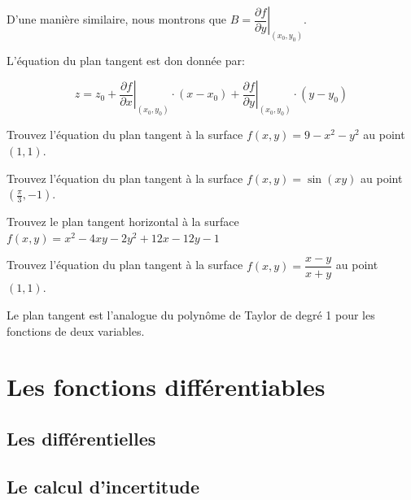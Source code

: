 \documentclass[]{book}
\theoremstyle{definition}
\theoremstyle{definition}
\theoremstyle{definition}
\theoremstyle{remark}
\let\BeginKnitrBlock\begin \let\EndKnitrBlock\end
\begin{document}
D'une manière similaire, nous montrons que
\(B=\left.\dfrac{\partial f}{\partial y}\right|_{(x_0,y_0)}\).

L'équation du plan tangent est don donnée par:

\[ z = z_0 + \left.\dfrac{\partial f}{\partial x}\right|_{(x_0,y_0)}\cdot (x-x_0)+\left.\dfrac{\partial f}{\partial y}\right|_{(x_0,y_0)}\cdot (y-y_0) \]

\BeginKnitrBlock{example}
\protect\hypertarget{exm:unnamed-chunk-171}{}{\label{exm:unnamed-chunk-171}
}Trouvez l'équation du plan tangent à la surface \(f(x,y)=9-x^2-y^2\) au
point \((1,1)\).
\EndKnitrBlock{example}
\vspace*{8cm}

\BeginKnitrBlock{example}
\protect\hypertarget{exm:unnamed-chunk-172}{}{\label{exm:unnamed-chunk-172}
}Trouvez l'équation du plan tangent à la surface \(f(x,y)=\sin(xy)\) au
point \(\left(\frac{\pi}{3},-1 \right)\).
\EndKnitrBlock{example}
\vspace*{8cm}

\BeginKnitrBlock{example}
\protect\hypertarget{exm:unnamed-chunk-173}{}{\label{exm:unnamed-chunk-173}
}Trouvez le plan tangent horizontal à la surface
\(f(x,y)=x^2-4xy-2y^2+12x-12y-1\)
\EndKnitrBlock{example}
\vspace*{8cm}

\BeginKnitrBlock{example}
\protect\hypertarget{exm:unnamed-chunk-174}{}{\label{exm:unnamed-chunk-174}
}Trouvez l'équation du plan tangent à la surface
\(f(x,y)=\dfrac{x-y}{x+y}\) au point \((1,1)\).
\EndKnitrBlock{example}
\vspace*{8cm}

\BeginKnitrBlock{remark}
{}Le plan tangent est l'analogue du polynôme
de Taylor de degré 1 pour les fonctions de deux variables.
\EndKnitrBlock{remark}

\hypertarget{les-fonctions-differentiables}{%
\section{Les fonctions
différentiables}\label{les-fonctions-differentiables}}

\hypertarget{les-differentielles}{%
\subsection{Les différentielles}\label{les-differentielles}}

\hypertarget{le-calcul-dincertitude}{%
\subsection{Le calcul d'incertitude}\label{le-calcul-dincertitude}}
\end{document}
